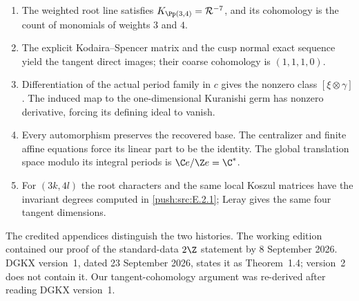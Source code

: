 \RungOne
\begin{enumerate}[label=\arabic*.]
\item The weighted root line satisfies
$K_{\Pp(3,4)}=\mathcal R^{-7}$, and its cohomology is
the count of monomials of weights $3$ and $4$.
\item The explicit Kodaira--Spencer matrix and the cusp
normal exact sequence yield the tangent direct images;
their coarse cohomology is $(1,1,1,0)$.
\item Differentiation of the actual period family in $c$
gives the nonzero class $[\xi\otimes\gamma]$.
The induced map to the one-dimensional Kuranishi germ
has nonzero derivative, forcing its defining ideal to
vanish.
\item Every automorphism preserves the recovered base.
The centralizer and finite affine equations force its
linear part to be the identity. The global translation
space modulo its integral periods is $\C e/\Z e=\C^*$.
\item For $(3k,4l)$ the root characters and the same
local Koszul matrices have the invariant degrees
computed in \ref{push:src:E.2.1}; Leray gives the same
four tangent dimensions.
\end{enumerate}
The credited appendices distinguish the two histories. The
working edition contained our proof of the standard-data
$2\Z$ statement by 8 September 2026. DGKX version~1,
dated 23 September 2026, states it as Theorem~1.4;
version~2 does not contain it. Our tangent-cohomology
argument was re-derived after reading DGKX version~1.

